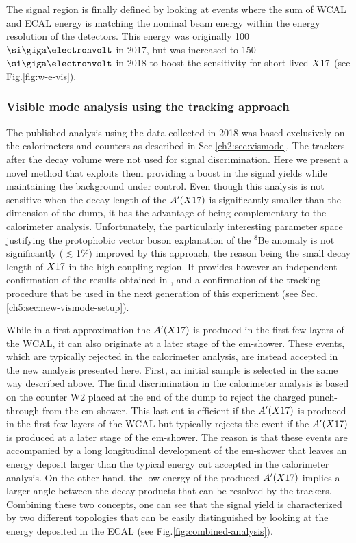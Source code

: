 The signal region is finally defined by looking at events where the sum of WCAL and ECAL energy is matching the nominal beam energy within the energy resolution of the detectors. This energy was originally 100 $\gev$ in 2017, but was increased to 150 $\gev$ in 2018 to boost the sensitivity for short-lived $X17$ (see Fig.\ref{fig:w-e-vis}).

\subsubsection{Visible mode analysis using the tracking approach}
\label{ch3:sec:vis-mode-tracking}

The published analysis using the data collected in 2018 \cite{Banerjee:2019hmi} was based exclusively on the calorimeters and counters as described in Sec.\ref{ch2:sec:vismode}. The trackers after the decay volume were not used for signal discrimination. Here we present a novel method that exploits them providing a boost in the signal yields while maintaining the background under control. Even though this analysis is not sensitive when the decay length of the $A'(X17)$ is significantly smaller than the dimension of the dump, it has the advantage of being complementary to the calorimeter analysis. Unfortunately, the particularly interesting parameter space justifying the protophobic vector boson explanation of the $^8$Be anomaly is not significantly ($\lesssim$1\%) improved by this approach, the reason being the small decay length of $X17$ in the high-coupling region. It provides however an independent confirmation of the results obtained in \cite{Banerjee:2019hmi}, and a confirmation of the tracking procedure that be used in the next generation of this experiment (see Sec.\ref{ch5:sec:new-vismode-setup}).

While in a first approximation the $A'(X17)$ is produced in the first few layers of the WCAL, it can also originate at a later stage of the em-shower. These events, which are typically rejected in the calorimeter analysis, are instead accepted in the new analysis presented here. First, an initial sample is selected in the same way described above. The final discrimination in the calorimeter analysis is based on the counter W2 placed at the end of the dump to reject the charged punch-through from the em-shower. This last cut is efficient if the $A'(X17)$ is produced in the first few layers of the WCAL but typically rejects the event if the $A'(X17)$ is produced at a later stage of the em-shower. The reason is that these events are accompanied by a long longitudinal development of the em-shower that leaves an energy deposit larger than the typical energy cut accepted in the calorimeter analysis. On the other hand, the low energy of the produced $A'(X17)$ implies a larger angle between the decay products that can be resolved by the trackers. Combining these two concepts, one can see that the signal yield is characterized by two different topologies that can be easily distinguished by looking at the energy deposited in the ECAL (see Fig.\ref{fig:combined-analysis}).

